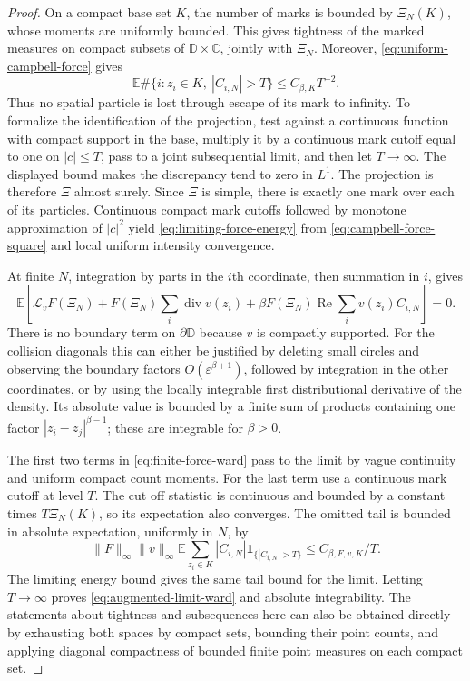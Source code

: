 \documentclass[11pt,a4paper]{article}
\numberwithin{equation}{section}
\theoremstyle{definition}
\theoremstyle{remark}
\newcommand{\D}{\mathbb D}
\newcommand{\E}{\mathbb E}
\newcommand{\C}{\mathbb C}
\begin{document}
\begin{proof}
On a compact base set $K$, the number of marks is bounded by $\Xi_N(K)$,
whose moments are uniformly bounded. This gives tightness of the marked
measures on compact subsets of $\D\times\C$, jointly with $\Xi_N$.
Moreover, \eqref{eq:uniform-campbell-force} gives
\[
 \E\#\{i:z_i\in K,\ |C_{i,N}|>T\}\le C_{\beta,K}T^{-2}.
\]
Thus no spatial particle is lost through escape of its mark to infinity.
To formalize the identification of the projection, test against a
continuous function with compact support in the base, multiply it by
a continuous mark cutoff equal to one on $|c|\le T$, pass to a joint
subsequential limit, and then let $T\to\infty$. The displayed bound
makes the discrepancy tend to zero in $L^1$. The projection is therefore
$\Xi$ almost surely. Since $\Xi$ is simple, there is exactly one mark
over each of its particles. Continuous compact mark cutoffs followed
by monotone approximation of $|c|^2$ yield
\eqref{eq:limiting-force-energy} from
\eqref{eq:campbell-force-square} and local uniform intensity convergence.

At finite $N$, integration by parts in the $i$th coordinate, then
summation in $i$, gives
\begin{equation}\label{eq:finite-force-ward}
 \E\left[\mathcal L_vF(\Xi_N)
       +F(\Xi_N)\sum_i\operatorname{div}v(z_i)
       +\beta F(\Xi_N)\operatorname{Re}\sum_iv(z_i)C_{i,N}\right]=0.
\end{equation}
There is no boundary term on $\partial\D$ because $v$ is compactly
supported. For the collision diagonals this can either be justified
by deleting small circles and observing the boundary factors
$O(\varepsilon^{\beta+1})$, followed by integration in the other
coordinates, or by using the locally integrable first distributional
derivative of the density. Its absolute value is bounded by a finite
sum of products containing one factor $|z_i-z_j|^{\beta-1}$;
these are integrable for $\beta>0$.

The first two terms in \eqref{eq:finite-force-ward} pass to the limit
by vague continuity and uniform compact count moments. For the last
term use a continuous mark cutoff at level $T$. The cut off statistic
is continuous and bounded by a constant times $T\Xi_N(K)$, so its
expectation also converges. The omitted tail is bounded in absolute
expectation, uniformly in $N$, by
\[
 \|F\|_\infty\|v\|_\infty
   \E\sum_{z_i\in K}|C_{i,N}|\mathbf1_{\{|C_{i,N}|>T\}}
 \le C_{\beta,F,v,K}/T.
\]
The limiting energy bound gives the same tail bound for the limit.
Letting $T\to\infty$ proves \eqref{eq:augmented-limit-ward} and absolute
integrability. The statements about tightness and subsequences here
can also be obtained directly by exhausting both spaces by compact
sets, bounding their point counts, and applying diagonal compactness
of bounded finite point measures on each compact set.
\end{proof}
\end{document}
